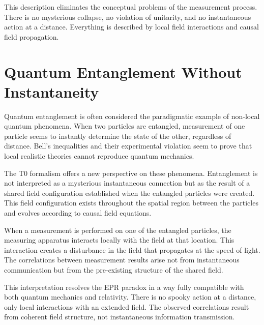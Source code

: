 	This description eliminates the conceptual problems of the measurement process. There is no mysterious collapse, no violation of unitarity, and no instantaneous action at a distance. Everything is described by local field interactions and causal field propagation.
	
	\section{Quantum Entanglement Without Instantaneity}
	
	Quantum entanglement is often considered the paradigmatic example of non-local quantum phenomena. When two particles are entangled, measurement of one particle seems to instantly determine the state of the other, regardless of distance. Bell's inequalities and their experimental violation seem to prove that local realistic theories cannot reproduce quantum mechanics.
	
	The T0 formalism offers a new perspective on these phenomena. Entanglement is not interpreted as a mysterious instantaneous connection but as the result of a shared field configuration established when the entangled particles were created. This field configuration exists throughout the spatial region between the particles and evolves according to causal field equations.
	
	When a measurement is performed on one of the entangled particles, the measuring apparatus interacts locally with the field at that location. This interaction creates a disturbance in the field that propagates at the speed of light. The correlations between measurement results arise not from instantaneous communication but from the pre-existing structure of the shared field.
	
	This interpretation resolves the EPR paradox in a way fully compatible with both quantum mechanics and relativity. There is no spooky action at a distance, only local interactions with an extended field. The observed correlations result from coherent field structure, not instantaneous information transmission.
